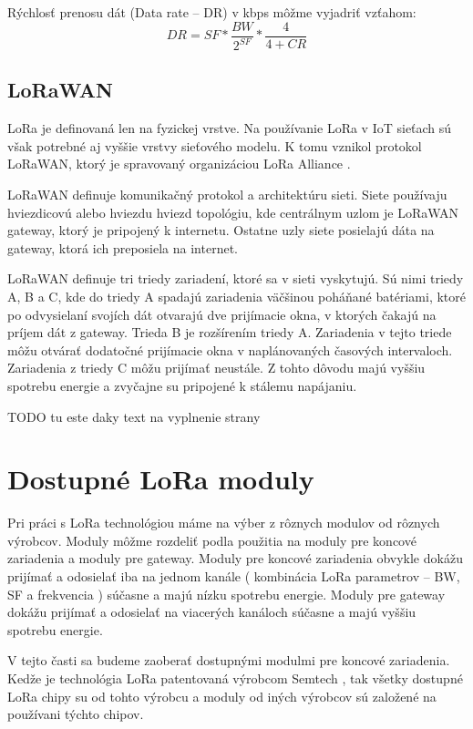 \documentclass[slovak,master]{diploma}
\begin{document}
Rýchlosť prenosu dát (Data rate -- DR) v kbps môžme vyjadriť vzťahom:
\begin{equation}
  DR = SF * \frac{BW}{2^{SF}} * \frac{4}{4+CR}
\end{equation}

\section{LoRaWAN}
LoRa je definovaná len na fyzickej vrstve. Na používanie LoRa v IoT sieťach sú však potrebné aj vyššie vrstvy sieťového modelu.
K tomu vznikol protokol LoRaWAN, ktorý je spravovaný organizáciou LoRa Alliance \cite{lora}.

LoRaWAN definuje komunikačný protokol a architektúru sieti. Siete používaju hviezdicovú alebo hviezdu hviezd topológiu, kde 
centrálnym uzlom je LoRaWAN gateway, ktorý je pripojený k internetu. Ostatne uzly siete posielajú dáta na gateway, ktorá ich preposiela na internet.

LoRaWAN definuje tri triedy zariadení, ktoré sa v sieti vyskytujú. Sú nimi triedy A, B a C, kde do triedy A spadajú zariadenia 
väčšinou poháňané batériami, ktoré po odvysielaní svojích dát otvarajú dve prijímacie okna, v ktorých čakajú na príjem dát z gateway.
Trieda B je rozšírením triedy A. Zariadenia v tejto triede môžu otvárať dodatočné prijímacie okna v naplánovaných časových intervaloch.
Zariadenia z triedy C môžu prijímať neustále. Z tohto dôvodu majú vyššiu spotrebu energie a zvyčajne su pripojené k stálemu napájaniu.

TODO tu este daky text na vyplnenie strany

\chapter{Dostupné LoRa moduly }
Pri práci s LoRa technológiou máme na výber z rôznych modulov od rôznych výrobcov.
Moduly môžme rozdeliť podla použitia na moduly pre koncové zariadenia a moduly pre gateway.
Moduly pre koncové zariadenia obvykle dokážu prijímať a odosielať iba na jednom kanále ( kombinácia LoRa parametrov --  BW, SF a frekvencia ) súčasne a majú 
nízku spotrebu energie. Moduly pre gateway dokážu prijímať a odosielať na viacerých kanáloch súčasne a majú vyššiu spotrebu energie.

V tejto časti sa budeme zaoberať dostupnými modulmi pre koncové zariadenia.
Kedže je technológia LoRa patentovaná výrobcom Semtech \cite{semtech}, tak všetky dostupné LoRa chipy su od tohto výrobcu a moduly od iných výrobcov 
sú založené na používani týchto chipov.
\end{document}
